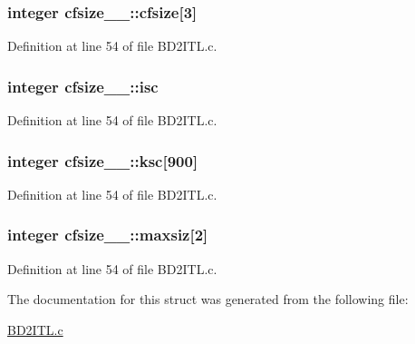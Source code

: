 \subsubsection[{\texorpdfstring{cfsize}{cfsize}}]{\setlength{\rightskip}{0pt plus 5cm}integer cfsize\+\_\+\_\+\+::cfsize\mbox{[}3\mbox{]}}\hypertarget{structcfsize__1___a0b7546b13614f0ab18107b0cf24dc019}{}\label{structcfsize__1___a0b7546b13614f0ab18107b0cf24dc019}


Definition at line 54 of file B\+D2\+I\+T\+L.\+c.

\subsubsection[{\texorpdfstring{isc}{isc}}]{\setlength{\rightskip}{0pt plus 5cm}integer cfsize\+\_\+\_\+\+::isc}\hypertarget{structcfsize__1___a4b539fb62bf158151557e116f4324ac2}{}\label{structcfsize__1___a4b539fb62bf158151557e116f4324ac2}


Definition at line 54 of file B\+D2\+I\+T\+L.\+c.

\subsubsection[{\texorpdfstring{ksc}{ksc}}]{\setlength{\rightskip}{0pt plus 5cm}integer cfsize\+\_\+\_\+\+::ksc\mbox{[}900\mbox{]}}\hypertarget{structcfsize__1___a2d4ff4bdc178e1b20b87e419f562eb8a}{}\label{structcfsize__1___a2d4ff4bdc178e1b20b87e419f562eb8a}


Definition at line 54 of file B\+D2\+I\+T\+L.\+c.

\subsubsection[{\texorpdfstring{maxsiz}{maxsiz}}]{\setlength{\rightskip}{0pt plus 5cm}integer cfsize\+\_\+\_\+\+::maxsiz\mbox{[}2\mbox{]}}\hypertarget{structcfsize__1___ad1842b6e18dee23a07d08eb05080b972}{}\label{structcfsize__1___ad1842b6e18dee23a07d08eb05080b972}


Definition at line 54 of file B\+D2\+I\+T\+L.\+c.



The documentation for this struct was generated from the following file\+:\begin{DoxyCompactItemize}
\item 
\hyperlink{BD2ITL_8c}{B\+D2\+I\+T\+L.\+c}\end{DoxyCompactItemize}
